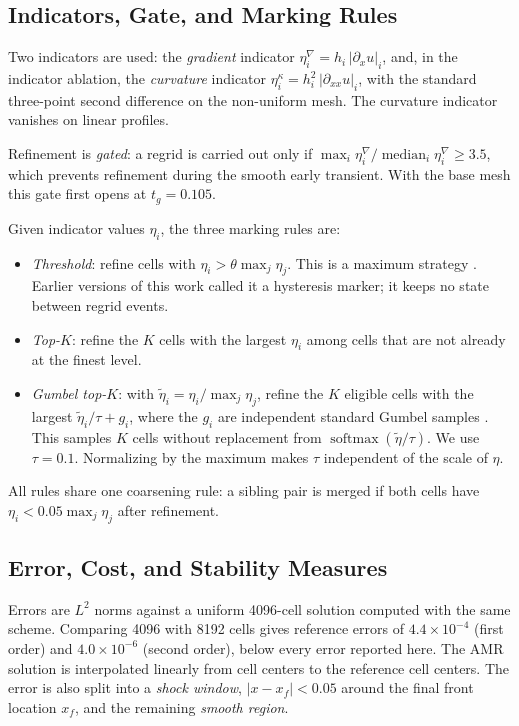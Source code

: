 \documentclass[conference]{IEEEtran}
\begin{document}
\subsection{Indicators, Gate, and Marking Rules}

Two indicators are used: the \emph{gradient} indicator $\eta^{\nabla}_i = h_i\,|\partial_x u|_i$, and, in the indicator ablation, the \emph{curvature} indicator $\eta^{\kappa}_i = h_i^2\,|\partial_{xx} u|_i$, with the standard three-point second difference on the non-uniform mesh. The curvature indicator vanishes on linear profiles.

Refinement is \emph{gated}: a regrid is carried out only if $\max_i \eta^{\nabla}_i / \operatorname{median}_i \eta^{\nabla}_i \ge 3.5$, which prevents refinement during the smooth early transient. With the base mesh this gate first opens at $t_g = 0.105$.

Given indicator values $\eta_i$, the three marking rules are:
\begin{itemize}
\item \emph{Threshold}: refine cells with $\eta_i > \theta \max_j \eta_j$. This is a maximum strategy \cite{babuska1978}. Earlier versions of this work called it a hysteresis marker; it keeps no state between regrid events.
\item \emph{Top-$K$}: refine the $K$ cells with the largest $\eta_i$ among cells that are not already at the finest level.
\item \emph{Gumbel top-$K$}: with $\tilde\eta_i = \eta_i / \max_j \eta_j$, refine the $K$ eligible cells with the largest $\tilde\eta_i / \tau + g_i$, where the $g_i$ are independent standard Gumbel samples \cite{kool2019}. This samples $K$ cells without replacement from $\operatorname{softmax}(\tilde\eta/\tau)$. We use $\tau = 0.1$. Normalizing by the maximum makes $\tau$ independent of the scale of $\eta$.
\end{itemize}
All rules share one coarsening rule: a sibling pair is merged if both cells have $\eta_i < 0.05 \max_j \eta_j$ after refinement.

\subsection{Error, Cost, and Stability Measures}

Errors are $L^2$ norms against a uniform 4096-cell solution computed with the same scheme. Comparing 4096 with 8192 cells gives reference errors of $4.4\times10^{-4}$ (first order) and $4.0\times10^{-6}$ (second order), below every error reported here. The AMR solution is interpolated linearly from cell centers to the reference cell centers. The error is also split into a \emph{shock window}, $|x - x_f| < 0.05$ around the final front location $x_f$, and the remaining \emph{smooth region}.
\end{document}
